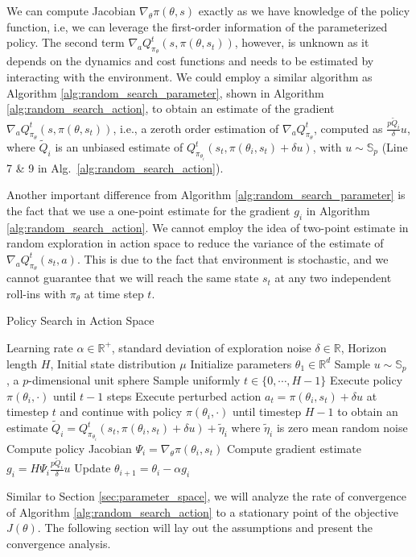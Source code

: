 %

We can compute Jacobian $\nabla_{\theta}\pi(\theta,s)$ exactly as we have knowledge of the policy function, i.e, we can leverage the first-order information of the parameterized policy. The
second term $\nabla_a Q_{\pi_\theta}^t(s, \pi(\theta, s_t))$, however, is unknown as it depends on the dynamics and cost functions and
needs to be estimated by interacting with the environment. We could
employ a similar algorithm as Algorithm \ref{alg:random_search_parameter}, shown in Algorithm \ref{alg:random_search_action}, to
obtain an estimate of the gradient $\nabla_a Q_{\pi_\theta}^t(s,
\pi(\theta, s_t))$, i.e., a zeroth order estimation of $\nabla_{a}Q^{t}_{\pi_{\theta}}$, computed as $\frac{p \tilde{Q}_i}{\delta}u$, where $\tilde{Q}_i$ is an unbiased estimate of ${Q}^{t}_{\pi_{\theta_i}}(s_t, \pi(\theta_i,s_t)  + \delta u)$, with $u\sim \mathbb{S}_{p}$ (Line 7 \& 9 in Alg.~\ref{alg:random_search_action}).


Another important difference from Algorithm
\ref{alg:random_search_parameter} is the fact that we use a one-point
estimate for the gradient $g_i$ in Algorithm
\ref{alg:random_search_action}. We cannot employ the idea of two-point estimate  in random exploration
in action space to reduce the variance of the estimate of $\nabla_{a}Q^{t}_{\pi_{\theta}}(s_t,a)$. This is due to the fact that environment is stochastic, and we cannot guarantee that we will reach the same state $s_t$ at any two independent roll-ins with $\pi_{\theta}$ at time step $t$.
\begin{algorithm}[ht]
\caption{Policy Search in Action Space}
 \label{alg:random_search_action}
\begin{algorithmic}[1]
   Learning rate $\alpha \in\mathbb{R}^+$,
  standard deviation of exploration noise $\delta\in\mathbb{R}$,
  Horizon length $H$, Initial state distribution $\mu$
  \State Initialize parameters $\theta_1\in\mathbb{R}^d$
    \State Sample $u \sim \mathbb{S}_p$ , a $p$-dimensional unit
    sphere
    \State Sample uniformly $t \in \{0, \cdots, H-1\}$
    \State Execute policy $\pi(\theta_i, \cdot)$ until $t-1$ steps
    \State Execute perturbed action $a_t = \pi(\theta_i, s_t) + \delta
    u$ at timestep $t$ and continue with policy $\pi(\theta_i, \cdot)$
    until timestep $H-1$
    to obtain an estimate $\tilde{Q}_i = Q^t_{\pi_{\theta_i}}(s_t,
    \pi(\theta_i, s_t) + \delta u) + \tilde{\eta}_i$ where
    $\tilde{\eta}_i$ is zero mean random noise
    \State Compute policy Jacobian
    $\Psi_i = \nabla_\theta \pi(\theta_i, s_t)$
    \State Compute gradient estimate $g_i = H\Psi_i\frac{p\tilde{Q}_i}{\delta}u$
    \State Update $\theta_{i+1} = \theta_i - \alpha g_i$
  \EndFor
\end{algorithmic}
\end{algorithm}
Similar to Section \ref{sec:parameter_space}, we will analyze the rate of convergence of Algorithm \ref{alg:random_search_action}
to a stationary point of the objective $J(\theta)$. The following
section will lay out the assumptions and  present the convergence
analysis.

